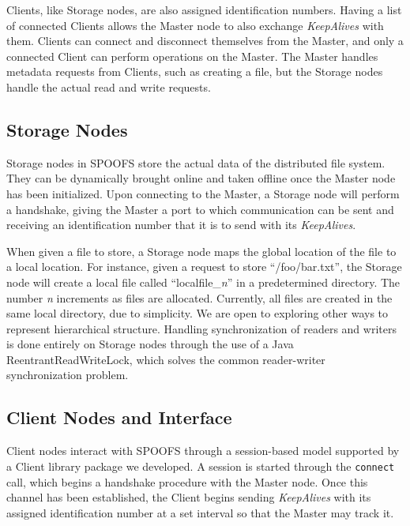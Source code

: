Clients, like Storage nodes, are also assigned identification numbers. Having a list of connected Clients allows the Master node to also exchange \textit{KeepAlives} with them. Clients can connect and disconnect themselves from the Master, and only a connected Client can perform operations on the Master.  The Master handles metadata requests from Clients, such as creating a file, but the Storage nodes handle the actual read and write requests.

\subsection{Storage Nodes}

Storage nodes in SPOOFS store the actual data of the distributed file system. They can be dynamically brought online and taken offline once the Master node has been initialized. Upon connecting to the Master, a Storage node will perform a handshake, giving the Master a port to which communication can be sent and receiving an identification number that it is to send with its \textit{KeepAlives}.

When given a file to store, a Storage node maps the global location of the file to a local location.  For instance, given a request to store ``/foo/bar.txt'', the Storage node will create a local file called ``localfile\_\textit{n}'' in a predetermined directory.  The number \textit{n} increments as files are allocated.  Currently, all files are created in the same local directory, due to simplicity.  We are open to exploring other ways to represent hierarchical structure. Handling synchronization of readers and writers is done entirely on Storage nodes through the use of a Java ReentrantReadWriteLock, which solves the common reader-writer synchronization problem.

\subsection{Client Nodes and Interface}

Client nodes interact with SPOOFS through a session-based model supported by a Client library package we developed. A session is started through the \texttt{connect} call, which begins a handshake procedure with the Master node. Once this channel has been established, the Client begins sending \textit{KeepAlives} with its assigned identification number at a set interval so that the Master may track it.

